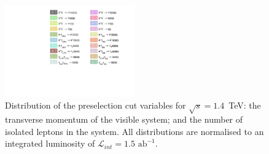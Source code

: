 \begin{figure}[h!]
\centering
{}
 \hfill
\includegraphics[width=0.5\textwidth]{PhysicsAnalysis/Plots/PreSelection/1400GeV/Legend.pdf}
\caption[Distribution of the preselection cut variables for $\sqrt{s}=1.4$~TeV: \protect{} the transverse momentum of the visible system; and \protect{} the number of isolated leptons in the system.  All distributions are normalised to an integrated luminosity of $\mathcal{L}_{int} = 1.5\text{ ab}^{-1}$.]{Distribution of the preselection cut variables for $\sqrt{s}=1.4$~TeV: \protect{} the transverse momentum of the visible system; and \protect{} the number of isolated leptons in the system.  All distributions are normalised to an integrated luminosity of $\mathcal{L}_{int} = 1.5\text{ ab}^{-1}$.}
\label{fig:preselection1400}
\end{figure}

